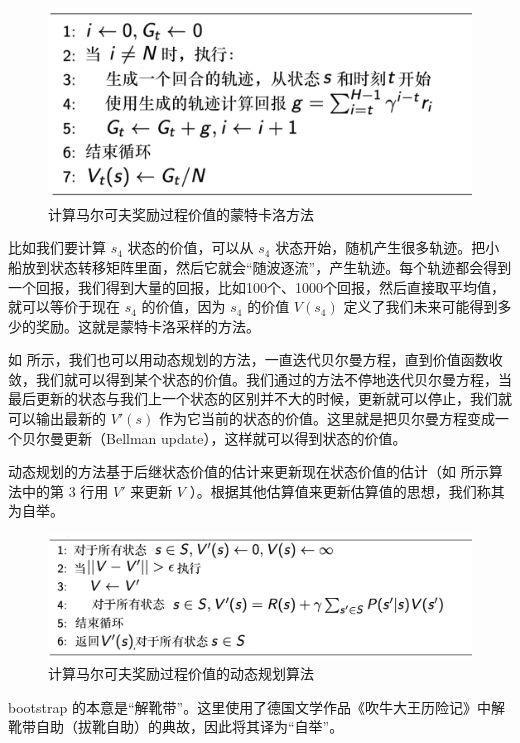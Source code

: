 \begin{figure}[hbt]
  \centering
  \includegraphics[width=0.6\linewidth]{res/ch2/2.16}
  \caption{计算马尔可夫奖励过程价值的蒙特卡洛方法}
  \label{fig:fig2.16}
\end{figure}

比如我们要计算 $s_4$ 状态的价值，可以从 $s_4$ 状态开始，随机产生很多轨迹。把小船放到状态转移矩阵里面，然后它就会“随波逐流”，产生轨迹。每个轨迹都会得到一个回报，我们得到大量的回报，比如100个、1000个回报，然后直接取平均值，就可以等价于现在 $s_4$ 的价值，因为 $s_4$ 的价值 $V(s_4)$  定义了我们未来可能得到多少的奖励。这就是蒙特卡洛采样的方法。

如 所示，我们也可以用动态规划的方法，一直迭代贝尔曼方程，直到价值函数收敛，我们就可以得到某个状态的价值。我们通过的方法不停地迭代贝尔曼方程，当最后更新的状态与我们上一个状态的区别并不大的时候，更新就可以停止，我们就可以输出最新的 $V'(s)$ 作为它当前的状态的价值。这里就是把贝尔曼方程变成一个贝尔曼更新（Bellman update），这样就可以得到状态的价值。

动态规划的方法基于后继状态价值的估计来更新现在状态价值的估计（如 所示算法中的第 3 行用 $V'$ 来更新 $V$ ）。根据其他估算值来更新估算值的思想，我们称其为自举。

\begin{figure}[hbt]
  \centering
  \includegraphics[width=0.7\linewidth]{res/ch2/2.17}
  \caption{计算马尔可夫奖励过程价值的动态规划算法}
  \label{fig:fig2.17}
\end{figure}

\begin{tcolorbox}[colframe=blue!25,colback=blue!10]
  bootstrap 的本意是“解靴带”。这里使用了德国文学作品《吹牛大王历险记》中解靴带自助（拔靴自助）的典故，因此将其译为“自举”。
\end{tcolorbox}


